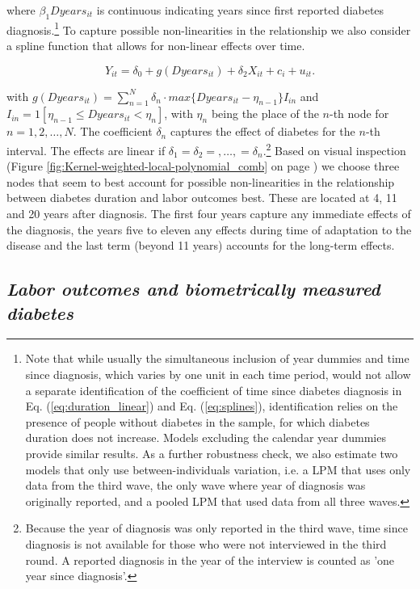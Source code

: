 \documentclass[12pt,english]{article}
\begin{document}
\noindent where $\beta_{1}Dyears_{it}$ is continuous indicating years since first reported diabetes diagnosis.\footnote{Note that while usually the simultaneous inclusion of year dummies and time since diagnosis, which varies by one unit in each time period, would not allow a separate identification of the coefficient of time since diabetes diagnosis in Eq.  (\ref{eq:duration_linear}) and Eq.  (\ref{eq:splines}), identification relies on the presence of people without diabetes in the sample, for which diabetes duration does not increase.  Models excluding the calendar year dummies provide similar results.  As a further robustness check, we also estimate two models that only use between-individuals variation, i.e. a \ac{LPM} that uses only data from the third wave, the only wave where year of diagnosis was originally reported, and a pooled \ac{LPM} that used data from all three waves.} To capture possible non-linearities in the relationship we also consider a spline function that allows for non-linear effects over time.

\begin{equation}
Y_{it}=\delta_{0}+g(Dyears_{it})+\delta_{2}X_{it}+c_{i}+u_{it}.\label{eq:splines}
\end{equation}

\noindent with $g(Dyears_{it})=\sum_{n=1}^{N}\delta_{n}\cdot max\{Dyears_{it}-\eta_{n-1}\}I_{in}$ and $I_{in}=1[\eta_{n-1}\leq Dyears_{it}<\eta_{n}]$, with $\eta_{n}$ being the place of the $n$-th node for $n=1,2,\ldots,N$. The coefficient $\delta_{n}$ captures the effect of diabetes for the $n$-th interval. The effects are linear if $\delta_{1}=\delta_{2}=,\ldots,=\delta_{n}$.\footnote{Because the year of diagnosis was only reported in the third wave, time since diagnosis is not available for those who were not interviewed in the third round.  A reported diagnosis in the year of the interview is counted as 'one year since diagnosis'.} Based on visual inspection (Figure \ref{fig:Kernel-weighted-local-polynomial_comb} on page \pageref{fig:Kernel-weighted-local-polynomial_comb}) we choose three nodes that seem to best account for possible non-linearities in the relationship between diabetes duration and labor outcomes best. These are located at 4, 11 and 20 years after diagnosis. The first four years capture any immediate effects of the diagnosis, the years five to eleven any effects during time of adaptation to the disease and the last term (beyond 11 years) accounts for the long-term effects.

\subsection{\label{sec:Biomarker Strategy}\textit{Labor outcomes and biometrically measured diabetes}}
\end{document}
